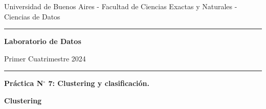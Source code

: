\documentclass[a4paper,11pt]{article}
\theoremstyle{definition}
\begin{document}
\centerline{{\small Universidad de Buenos Aires - Facultad de Ciencias Exactas y Naturales - Ciencias de Datos}}

\vskip 0.2cm

\hrule

\vskip 0.2cm

 \centerline{{\bf\Large{\sc Laboratorio de Datos}}}

 \vskip 0.2cm

 \centerline{\ttfamily Primer Cuatrimestre 2024}

\vskip 0.2cm

 \hrule

 \bigskip
 \centerline{\bf Práctica N$^\circ$ 7: Clustering y clasificación.}
 \bigskip


\textbf{Clustering}
\end{document}
